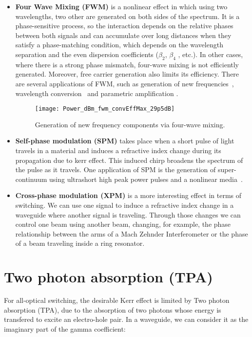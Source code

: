 \begin{itemize}
\item \textbf{Four Wave Mixing (FWM)} is a nonlinear effect in which using two wavelengths, two other are generated on both sides of the spectrum.
It is a phase-sensitive process, so the interaction depends on the relative phases between both signals and can accumulate over long distances when they satisfy a phase-matching condition, which depends on the wavelength separation and the even dispersion coefficients ($\beta_2$, $\beta_4$ , etc.).
In other cases, where there is a strong phase mismatch, four-wave mixing is not efficiently generated.
Moreover, free carrier generation also limits its efficiency.
There are several applications of FWM, such as generation of new frequencies~\cite{Bayvel1989}, wavelength conversion~\cite{Inoue1992,Lee2009} and parametric amplification \cite{Carman1966,Stolen1982,Foster2006}.

\begin{figure}[htb]
    \centering
    \texttt{[image: Power\_dBm\_fwm\_convEffMax\_29p5dB]}
    \caption{Generation of new frequency components via four-wave mixing.}
    \label{fig:fwmMaxEfficiency}
\end{figure}

\item \textbf{Self-phase modulation (SPM)} takes place when a short pulse of light travels in a material and induces a refractive index change during its propagation due to kerr effect. This induced chirp broadens the spectrum of the pulse as it travels. One application of SPM is the generation of super-continuum using ultrashort high peak power pulses and a nonlinear media~\cite{Boyraz2004}.

\item \textbf{Cross-phase modulation (XPM)} is a more interesting effect in terms of switching. We can use one signal to induce a refractive index change in a waveguide where another signal is traveling. Through those changes we can control one beam using another beam, changing, for example, the phase relationship between the arms of a Mach Zehnder Interferometer or the phase of a beam traveling inside a ring resonator.

\end{itemize}



\section{Two photon absorption (TPA)}
For all-optical switching, the desirable Kerr effect is limited by Two photon absorption (TPA), due to the absorption of two photons whose energy is transfered to excite an electro-hole pair.
In a waveguide, we can consider it as the imaginary part of the gamma coefficient:

